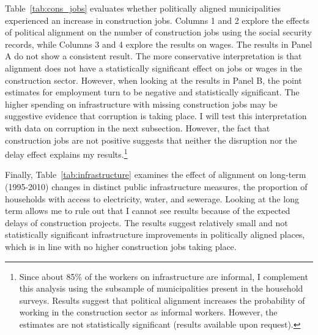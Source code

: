 \documentclass[dv_diss_main.tex]{subfiles}
\begin{document}
Table~\ref{tab:cons_jobs} evaluates whether politically aligned municipalities experienced an increase in construction jobs. Columns 1 and 2 explore the effects of political alignment on the number of construction jobs using the social security records, while Columns 3 and 4 explore the results on wages.  The results in Panel A do not show a consistent result. The more conservative interpretation is that alignment does not have a statistically significant effect on jobs or wages in the construction sector. However, when looking at the results in Panel B, the point estimates for employment turn to be negative and statistically significant. The higher spending on infrastructure with missing construction jobs may be suggestive evidence that corruption is taking place. I will test this interpretation with data on corruption in the next subsection. However, the fact that construction jobs are not positive suggests that neither the disruption nor the delay effect explains my results.\footnote{Since about 85\% of the workers on infrastructure are informal, I complement this analysis using the subsample of municipalities present in the household surveys. Results suggest that political alignment increases the probability of working in the construction sector as informal workers. However, the estimates are not statistically significant (results available upon request).}

Finally, Table~\ref{tab:infrastructure} examines the effect of alignment on long-term (1995-2010) changes in distinct public infrastructure measures, the proportion of households with access to electricity, water, and sewerage.  Looking at the long term allows me to rule out that I cannot see results because of the expected delays of construction projects. The results suggest relatively small and not statistically significant infrastructure improvements in politically aligned places, which is in line with no higher construction jobs taking place.
\end{document}
